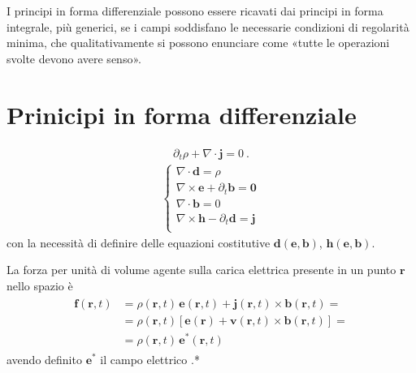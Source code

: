 \documentclass[letterpaper,10pt,italian]{jupyterBook}
\begin{document}
\sphinxAtStartPar
I principi in forma differenziale possono essere ricavati dai principi in forma integrale, più generici, se i campi soddisfano le necessarie condizioni di regolarità minima, che qualitativamente si possono enunciare come «tutte le operazioni svolte devono avere senso».


\section{Prinicipi in forma differenziale}
\label{\detokenize{ch/principles:prinicipi-in-forma-differenziale}}
\sphinxAtStartPar
{}
\begin{equation*}
\begin{split}\partial_t \rho + \nabla \cdot \mathbf{j} = 0 \ .\end{split}
\end{equation*}
\sphinxAtStartPar
{}
\begin{equation*}
\begin{split}\begin{cases}
 \nabla \cdot \mathbf{d} = \rho \\
 \nabla \times \mathbf{e} + \partial_t \mathbf{b} = \mathbf{0} \\ 
 \nabla \cdot \mathbf{b} = 0 \\
 \nabla \times \mathbf{h} - \partial_t \mathbf{d} = \mathbf{j} \\
\end{cases}\end{split}
\end{equation*}
\sphinxAtStartPar
con la necessità di definire delle equazioni costitutive \(\mathbf{d}(\mathbf{e}, \mathbf{b})\), \(\mathbf{h}(\mathbf{e}, \mathbf{b})\).

\sphinxAtStartPar
{} La forza per unità di volume agente sulla carica elettrica presente in un punto \(\mathbf{r}\) nello spazio è
\begin{equation*}
\begin{split}\begin{aligned}
  \mathbf{f}(\mathbf{r},t) & = \rho(\mathbf{r},t) \, \mathbf{e}(\mathbf{r},t) + \mathbf{j}(\mathbf{r},t) \times \mathbf{b}(\mathbf{r},t) = \\
                           & = \rho(\mathbf{r},t) \left[ \mathbf{e}(\mathbf{r}) + \mathbf{v}(\mathbf{r},t) \times \mathbf{b}(\mathbf{r},t) \right] =  \\
                           & = \rho(\mathbf{r},t) \, \mathbf{e}^*(\mathbf{r},t) 
\end{aligned}\end{split}
\end{equation*}
\sphinxAtStartPar
avendo definito \(\mathbf{e}^*\) il campo elettrico .*
\end{document}
